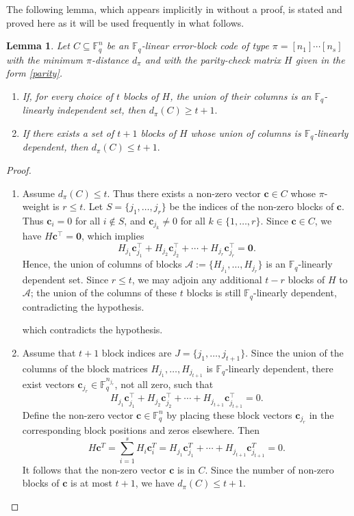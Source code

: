 \documentclass[11pt]{article}
\newtheorem{Definition and Notation}[Theorem]{Definition and Notation}
\newtheorem{Lemma}[Theorem]{Lemma}
\begin{document}
The following lemma, which appears implicitly in \cite[Theorem 2.1]{Feng2006} without a proof, is stated and proved here as it will be used frequently in what follows.

\begin{Lemma}\label{ma14}
Let $C\subseteq\mathbb F_q^n$ be an $\mathbb F_q$-linear error-block code of type $\pi=[n_1]\cdots[n_s]$ with the minimum $\pi$-distance $d_{\pi}$ and with the parity-check matrix $H$ given in the form \eqref{parity}.
\begin{enumerate}
    \item If, for every choice of $t$ blocks of $H$, the union of their columns is an $\mathbb F_q$-linearly independent set, then $d_{\pi}(C)\ge t+1.$
    \item If there exists a set of $t+1$ blocks of $H$ whose union of columns is $\mathbb F_q$-linearly dependent, then $d_\pi(C)\le t+1.$
\end{enumerate}
\end{Lemma}

\begin{proof}
\begin{enumerate}
    \item Assume $d_\pi(C)\le t$. Thus there exists a non-zero vector $\boldsymbol{c}\in C$ whose $\pi$-weight is $r\le t$. Let $S=\{j_1,\dots,j_r\}$ be the indices of the non-zero blocks of $\boldsymbol{c}$.
    Thus $\boldsymbol{c}_i=0$ for all $i\notin S$, and $\boldsymbol{c}_{j_k}\neq 0$ for all $k\in \{1,\dots,r\}$. Since $\boldsymbol{c}\in C$, we have $H\boldsymbol{c}^{\top}=\mathbf 0$, which implies
$$
H_{j_1} \boldsymbol{c}_{j_1}^\top + H_{j_2} \boldsymbol{c}_{j_2}^\top + \cdots + H_{j_r} \boldsymbol{c}_{j_r}^\top = \mathbf 0.
$$
Hence, the union of columns of blocks $\mathcal{A}:=\{H_{j_1},\dots,H_{j_r}\}$ is an $\mathbb F_q$-linearly dependent set. Since $r\le t$, we may adjoin any additional $t-r$ blocks of $H$ to $\mathcal{A}$; the union of the columns of these $t$ blocks is still $\mathbb F_q$-linearly dependent, contradicting the hypothesis.



which contradicts the hypothesis.
\item Assume that $t+1$ block indices are $J=\{j_1,\dots,j_{t+1}\}$. Since the union of the columns of the block matrices $H_{j_1},\dots,H_{j_{t+1}}$ is $\mathbb F_q$-linearly dependent, there exist vectors $\boldsymbol{c}_{j_r}\in\mathbb F_q^{n_{j_r}}$, not all zero, such that
$$
H_{j_1}\boldsymbol{c}_{j_1}^{\top} + H_{j_2}\boldsymbol{c}_{j_2}^{\top} + \cdots + H_{j_{t+1}}\boldsymbol{c}_{j_{t+1}}^{\top} = 0.
$$
Define the non-zero vector $\boldsymbol{c}\in\mathbb F_q^n$ by placing these block vectors $\boldsymbol{c}_{j_r}$ in the corresponding block positions and zeros elsewhere. Then 
$$
H \boldsymbol{c}^T = \sum_{i=1}^s H_i \boldsymbol{c}_i^T = H_{j_1}\boldsymbol{c}_{j_1}^T + \cdots + H_{j_{t+1}}\boldsymbol{c}_{j_{t+1}}^T = 0.
$$
It follows that the non-zero vector $\boldsymbol{c}$ is in $C$. Since the number of non-zero blocks of $\boldsymbol{c}$ is at most $t+1$, we have $d_{\pi}(C)\le t+1$.
\end{enumerate}
\end{proof}
\end{document}
